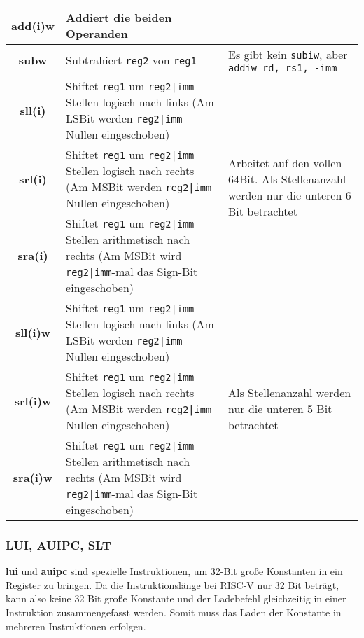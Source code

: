 \begin{tabular}{|c|p{8cm}|p{4cm}|}
	\hline
	\textbf{add(i)w} & Addiert die beiden Operanden & \\
	\hline
	\textbf{subw} & Subtrahiert \texttt{reg2} von \texttt{reg1}& Es gibt kein \texttt{subiw}, aber \texttt{addiw rd, rs1, -imm} \\
	\hline
	\textbf{sll(i)} & Shiftet \texttt{reg1} um \texttt{reg2|imm} Stellen logisch nach links (Am LSBit werden \texttt{reg2|imm} Nullen eingeschoben) & \multirow{3}{4cm}{Arbeitet auf den vollen 64Bit. Als Stellenanzahl werden nur die unteren 6 Bit betrachtet} \\
	\cline{1-2}
	\textbf{srl(i)} & Shiftet \texttt{reg1} um \texttt{reg2|imm} Stellen logisch nach rechts (Am MSBit werden \texttt{reg2|imm} Nullen eingeschoben) & \\
	\cline{1-2}
	\textbf{sra(i)} & Shiftet \texttt{reg1} um \texttt{reg2|imm} Stellen arithmetisch nach rechts (Am MSBit wird \texttt{reg2|imm}-mal das Sign-Bit eingeschoben) & \\
	\hline
	\textbf{sll(i)w} & Shiftet \texttt{reg1} um \texttt{reg2|imm} Stellen logisch nach links (Am LSBit werden \texttt{reg2|imm} Nullen eingeschoben) & \multirow{3}{4cm}{Als Stellenanzahl werden nur die unteren 5 Bit betrachtet} \\
	\cline{1-2}
	\textbf{srl(i)w} & Shiftet \texttt{reg1} um \texttt{reg2|imm} Stellen logisch nach rechts (Am MSBit werden \texttt{reg2|imm} Nullen eingeschoben) & \\
	\cline{1-2}
	\textbf{sra(i)w} & Shiftet \texttt{reg1} um \texttt{reg2|imm} Stellen arithmetisch nach rechts (Am MSBit wird \texttt{reg2|imm}-mal das Sign-Bit eingeschoben) & \\
	\hline
\end{tabular}

\subsubsection{LUI, AUIPC, SLT}
\textbf{lui} und \textbf{auipc} sind spezielle Instruktionen, um 32-Bit große Konstanten in ein Register zu bringen. Da die Instruktionslänge bei RISC-V nur 32 Bit beträgt, kann also keine 32 Bit große Konstante und der Ladebefehl gleichzeitig in einer Instruktion zusammengefasst werden. Somit muss das Laden der Konstante in mehreren Instruktionen erfolgen.\\

